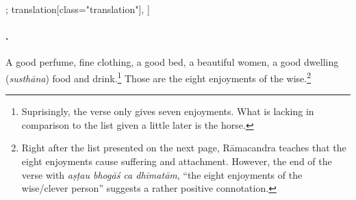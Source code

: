 \begin{alignment}[
  texts=edition[class="edition"];
  translation[class="translation"],
  ]
\begin{translation}
\begin{tlate}
\paragraph{\textsuperscript{}.} A good perfume, fine clothing, a good bed, a beautiful women, a good dwelling (\textit{susthāna}) food and drink.\footnote{Suprisingly, the verse only gives seven enjoyments. What is lacking in comparison to the list given a little later is the horse.} Those are the eight enjoyments of the wise.\footnote{Right after the list presented on the next page, Rāmacandra teaches that the eight enjoyments cause suffering and attachment. However, the end of the verse with \textit{aṣṭau bhogāś ca dhīmatām}, ``the eight enjoyments of the wise/clever person'' suggests a rather positive connotation.}
    \end{tlate}
  \end{translation}
\end{alignment}
